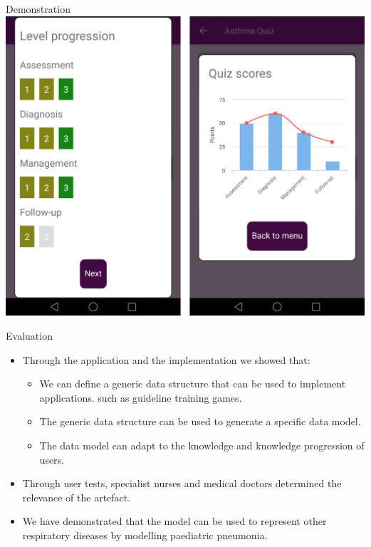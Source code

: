 \documentclass{beamer}
\begin{document}
\begin{frame}{Demonstration}
\includegraphics[scale=0.16]{Montage6}
\end{frame}

\begin{frame}{Evaluation}
\begin{itemize}
	\item Through the application and the implementation we showed that:
	\begin{itemize}
		\item We can define a generic data structure that can be used to implement applications. such as guideline training games.
		\item The generic data structure can be used to generate a specific data model.
		\item The data model can adapt to the knowledge and knowledge progression of users.
	\end{itemize}
	\item Through user tests, specialist nurses and medical doctors determined the relevance of the artefact.
	\item We have demonstrated that the model can be used to represent other respiratory diseases by modelling paediatric pneumonia.
\end{itemize}
\end{frame}
\end{document}
